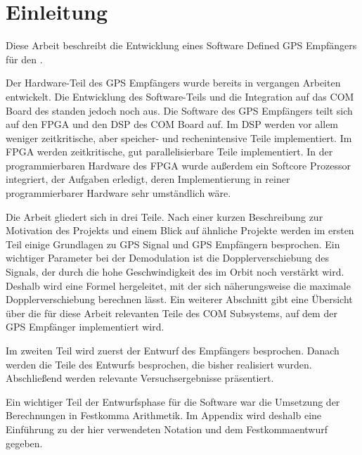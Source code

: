 \chapter{Einleitung}

Diese Arbeit beschreibt die Entwicklung eines Software Defined GPS Empfängers für den \dscubesat.

Der Hardware-Teil des GPS Empfängers wurde bereits in vergangen Arbeiten entwickelt. Die Entwicklung des Software-Teils und die Integration auf das COM Board des \dscubesat standen jedoch noch aus. Die Software des GPS Empfängers teilt sich auf den FPGA und den DSP des COM Board auf. Im DSP werden vor allem weniger zeitkritische, aber speicher- und rechenintensive Teile implementiert. Im FPGA werden zeitkritische, gut parallelisierbare Teile implementiert. In der programmierbaren Hardware des FPGA wurde außerdem ein Softcore Prozessor integriert, der Aufgaben erledigt, deren Implementierung in reiner programmierbarer Hardware sehr umständlich wäre.

Die Arbeit gliedert sich in drei Teile. Nach einer kurzen Beschreibung zur Motivation des Projekts und einem Blick auf ähnliche Projekte werden im ersten Teil einige Grundlagen zu GPS Signal und GPS Empfängern besprochen. Ein wichtiger Parameter bei der Demodulation ist die Dopplerverschiebung des Signals, der durch die hohe Geschwindigkeit des \dscubesat im Orbit noch verstärkt wird. Deshalb wird eine Formel hergeleitet, mit der sich näherungsweise die maximale Dopplerverschiebung berechnen lässt. Ein weiterer Abschnitt gibt eine Übersicht über die für diese Arbeit relevanten Teile des COM Subsystems, auf dem der GPS Empfänger implementiert wird.

Im zweiten Teil wird zuerst der Entwurf des Empfängers besprochen. Danach werden die Teile des Entwurfs besprochen, die bisher realisiert wurden. Abschließend werden relevante Versuchsergebnisse präsentiert.

Ein wichtiger Teil der Entwurfsphase für die Software war die Umsetzung der Berechnungen in Festkomma Arithmetik. Im Appendix wird deshalb eine Einführung zu der hier verwendeten Notation und dem Festkommaentwurf gegeben.



